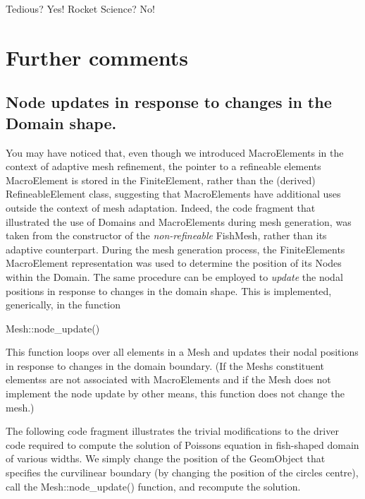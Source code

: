 Tedious? Yes! Rocket Science? No!



 

\hypertarget{index_com}{}\section{Further comments}\label{index_com}
\hypertarget{index_nod_update}{}\subsection{Node updates in response to changes in the Domain shape.}\label{index_nod_update}
You may have noticed that, even though we introduced {\ttfamily Macro\+Elements} in the context of adaptive mesh refinement, the pointer to a refineable element\textquotesingle{}s {\ttfamily Macro\+Element} is stored in the {\ttfamily Finite\+Element}, rather than the (derived) {\ttfamily Refineable\+Element} class, suggesting that {\ttfamily Macro\+Elements} have additional uses outside the context of mesh adaptation. Indeed, the code fragment that illustrated the use of {\ttfamily Domains} and {\ttfamily Macro\+Elements} during mesh generation, was taken from the constructor of the {\itshape non-\/refineable} {\ttfamily Fish\+Mesh}, rather than its adaptive counterpart. During the mesh generation process, the {\ttfamily Finite\+Element\textquotesingle{}s} {\ttfamily Macro\+Element} representation was used to determine the position of its {\ttfamily Nodes} within the {\ttfamily Domain}. The same procedure can be employed to {\itshape update} the nodal positions in response to changes in the domain shape. This is implemented, generically, in the function


\begin{DoxyCode}
Mesh::node\_update()
\end{DoxyCode}


This function loops over all elements in a {\ttfamily Mesh} and updates their nodal positions in response to changes in the domain boundary. (If the {\ttfamily Mesh\textquotesingle{}s} constituent elements\textquotesingle{}s are not associated with {\ttfamily Macro\+Elements} and if the {\ttfamily Mesh} does not implement the node update by other means, this function does not change the mesh.)

The following code fragment illustrates the trivial modifications to the driver code required to compute the solution of Poisson\textquotesingle{}s equation in fish-\/shaped domain of various widths. We simply change the position of the {\ttfamily Geom\+Object} that specifies the curvilinear boundary (by changing the position of the circle\textquotesingle{}s centre), call the {\ttfamily Mesh\+::node\+\_\+update()} function, and recompute the solution.

